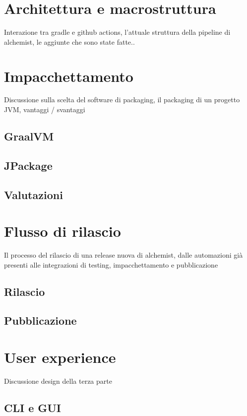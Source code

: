 \documentclass[12pt,a4paper,openright,twoside]{book}
\begin{document}
\section{Architettura e macrostruttura}
Interazione tra gradle e github actions, l’attuale struttura della pipeline di alchemist, le aggiunte che sono state fatte..

\section{Impacchettamento}
Discussione sulla scelta del software di packaging, il packaging di un progetto JVM, vantaggi / svantaggi

\subsection{GraalVM}

\subsection{JPackage}

\subsection{Valutazioni}

\section{Flusso di rilascio}
Il processo del rilascio di una release nuova di alchemist, dalle automazioni già presenti alle integrazioni di testing, impacchettamento e pubblicazione
\subsection{Rilascio}

\subsection{Pubblicazione}

\section{User experience}
Discussione design della terza parte

\subsection{CLI e GUI}
\end{document}

